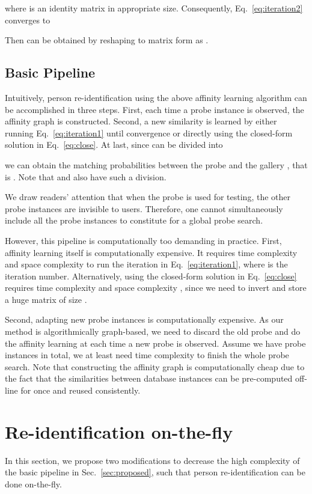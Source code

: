 \documentclass[10pt,twocolumn,letterpaper]{article}
\begin{document}
where  is an identity matrix in appropriate size.
Consequently, Eq.~\eqref{eq:iteration2} converges to

Then  can be obtained by reshaping  to matrix form as .

\subsection{Basic Pipeline}
Intuitively, person re-identification using the above affinity learning algorithm can be accomplished in three steps.
First, each time a probe instance  is observed, the affinity graph  is constructed.
Second, a new similarity  is learned by either running Eq.~\eqref{eq:iteration1} until convergence or directly using the closed-form solution in Eq.~\eqref{eq:close}.
At last, since  can be divided into

we can obtain the matching probabilities between the probe  and the gallery , that is . Note that  and  also have such a division.

We draw readers' attention that when the probe  is used for testing, the other probe instances are invisible to users. Therefore, one cannot simultaneously include all the probe instances to constitute  for a global probe search.

However, this pipeline is computationally too demanding in practice.
First, affinity learning itself is computationally expensive. It requires time complexity  and space complexity  to run the iteration in Eq.~\eqref{eq:iteration1}, where  is the iteration number. Alternatively, using the closed-form solution in Eq.~\eqref{eq:close} requires time complexity  and space complexity , since we need to invert and store a huge matrix of size .

Second, adapting new probe instances is computationally expensive. As our method is algorithmically graph-based, we need to discard the old probe and do the affinity learning at each time a new probe is observed.
Assume we have  probe instances in total, we at least need time complexity  to finish the whole probe search. Note that constructing the affinity graph is computationally cheap due to the fact that the similarities between database instances can be pre-computed off-line for once and reused consistently.

\section{Re-identification on-the-fly} \label{sec:fly}
In this section, we propose two modifications to decrease the high complexity of the basic pipeline in Sec.~\ref{sec:proposed}, such that person re-identification can be done on-the-fly.
\end{document}
